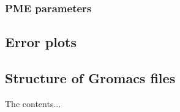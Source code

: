 \documentclass[12pt,twoside,a4paper]{report}
\begin{document}
	\subsection{PME parameters}
\section{Error plots}

\nocite{*}

 

\begin{appendices}
\chapter{Structure of Gromacs files}
The contents...
\end{appendices}
\end{document}
